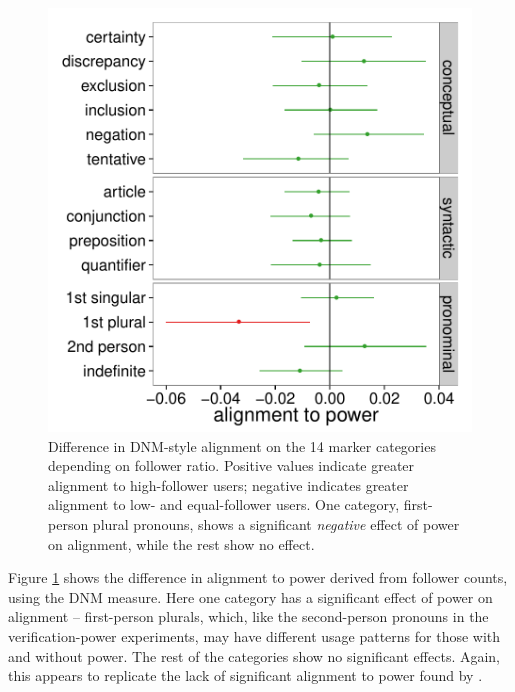 \documentclass{acm_proc_article-sp}
\begin{document}
\begin{figure}[t]
\centering
\includegraphics[width=.9\columnwidth]{graphics/www2016_dnmpowerdiff_fratio_final.pdf}
\caption{Difference in DNM-style alignment on the 14 marker categories depending on follower ratio. Positive values indicate greater alignment to high-follower users; negative indicates greater alignment to low- and equal-follower users. One category, first-person plural pronouns, shows a significant \textit{negative} effect of power on alignment, while the rest show no effect.}\label{fig:dnm-fratio}
\end{figure}

Figure \ref{fig:dnm-fratio} shows the difference in alignment to power derived from follower counts, using the DNM measure. Here one category has a significant effect of power on alignment -- first-person plurals, which, like the second-person pronouns in the verification-power experiments, may have different usage patterns for those with and without power.  The rest of the categories show no significant effects.  Again, this appears to replicate the lack of significant alignment to power found by \cite{DNMGamonDumais2011}.
\end{document}
